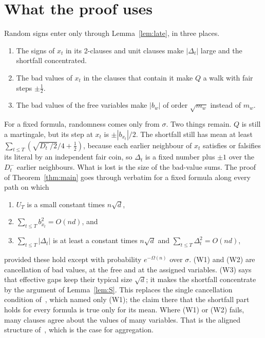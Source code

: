 \documentclass[11pt,a4paper]{article}
\theoremstyle{remark}
\begin{document}
\section{What the proof uses}\label{sec:uses}

Random signs enter only through Lemma~\ref{lem:late}, in three places.
\begin{enumerate}
 \item[(S)] The signs of $x_t$ in its 2-clauses and unit clauses make
 $|\Delta_t|$ large and the shortfall concentrated.
 \item[(Q)] The bad values of $x_t$ in the clauses that contain it make $Q$ a
 walk with fair steps $\pm\frac12$.
 \item[(U)] The bad values of the free variables make $|b_w|$ of order
 $\sqrt{m_w}$ instead of $m_w$.
\end{enumerate}
For a fixed formula, randomness comes only from $\sigma$. Two things remain. $Q$
is still a martingale, but its step at $x_t$ is $\pm|b_{x_t}|/2$. The shortfall
still has mean at least $\sum_{t\le T}(\sqrt{D^-_t/2}/4+\frac12)$, because each
earlier neighbour of $x_t$ satisfies or falsifies its literal by an independent
fair coin, so $\Delta_t$ is a fixed number plus $\pm1$ over the $D^-_t$ earlier
neighbours. What is lost is the size of the bad-value sums. The proof of
Theorem~\ref{thm:main} goes through verbatim for a fixed formula along every
path on which
\begin{enumerate}
 \item[(W1)] $U_T$ is a small constant times $n\sqrt d$,
 \item[(W2)] $\sum_{t\le T}b_{x_t}^2=O(nd)$, and
 \item[(W3)] $\sum_{t\le T}|\Delta_t|$ is at least a constant times $n\sqrt d$
 and $\sum_{t\le T}\Delta_t^2=O(nd)$,
\end{enumerate}
provided these hold except with probability $e^{-\Omega(n)}$ over $\sigma$.
(W1) and (W2) are cancellation of bad values, at the free and at the assigned
variables. (W3) says that effective gaps keep their typical size $\sqrt d$; it
makes the shortfall concentrate by the argument of Lemma~\ref{lem:S}. This
replaces the single cancellation condition of~\cite[Section~7]{N7}, which named
only (W1); the claim there that the shortfall part holds for every formula is
true only for its mean. Where (W1) or (W2) fails, many clauses agree about the
values of many variables. That is the aligned structure of~\cite[Section~9]{N4},
which is the case for aggregation.
\end{document}
